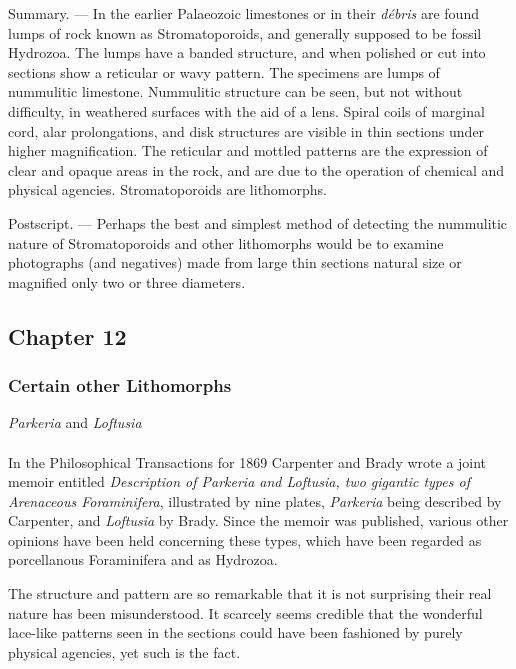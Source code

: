 \documentclass[a4paper, 12pt, oneside]{article}
\begin{document}
Summary. --- In the earlier Palaeozoic limestones or in their \emph{débris} are found lumps of rock known as Stromatoporoids, and generally supposed to be fossil Hydrozoa. The lumps have a banded structure, and when polished or cut into sections show a reticular or wavy pattern. The specimens are lumps of nummulitic limestone. Nummulitic structure can be seen, but not without difficulty, in weathered surfaces with the aid of a lens. Spiral coils of marginal cord, alar prolongations, and disk structures are visible in thin sections under higher magnification. The reticular and mottled patterns are the expression of clear and opaque areas in the rock, and are due to the operation of chemical and physical agencies. Stromatoporoids are lithomorphs.

Postscript. --- Perhaps the best and simplest method of detecting the nummulitic nature of Stromatoporoids and other lithomorphs would be to examine photographs (and negatives) made from large thin sections natural size or magnified only two or three diameters.
\clearpage
\subsection{Chapter 12}
\subsubsection{Certain other Lithomorphs}
\centerline{\emph{Parkeria} and \emph{Loftusia}}
\paragraph{}
In the Philosophical Transactions for 1869 Carpenter and Brady wrote a joint memoir entitled \emph{Description of \emph{Parkeria} and \emph{Loftusia}, two gigantic types of Arenaceous Foraminifera}, illustrated by nine plates, \emph{Parkeria} being described by Carpenter, and \emph{Loftusia} by Brady. Since the memoir was published, various other opinions have been held concerning these types, which have been regarded as porcellanous Foraminifera and as Hydrozoa.

The structure and pattern are so remarkable that it is not surprising their real nature has been misunderstood. It scarcely seems credible that the wonderful lace-like patterns seen in the sections could have been fashioned by purely physical agencies, yet such is the fact.
\end{document}
